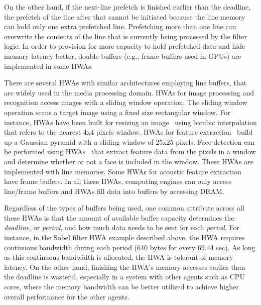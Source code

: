 \documentclass[10pt,letterpaper]{article}
\newcommand{\TMP}[1]{#1}
\newif\ifSQUEEZE
\begin{document}
On the other hand, if the next-line prefetch is finished earlier
than the deadline, the prefetch of the line after that cannot be
initiated because the line memory can hold only one extra
prefetched line. Prefetching more than one line can overwrite the
contents of the line that is currently being processed by the
filter logic. 
\TMP{In order to provision for more capacity to hold prefetched
data and hide memory latency better, double buffers (e.g., frame buffers used in
GPUs) are implemented in some HWAs.}


\ifSQUEEZE
There are several HWAs with similar architectures employing line/frame
buffers, which are widely used in the media processing domain. 
HWAs for resizing an image~\cite{resizing} or feature extraction~\cite{HWA_sift,HWA_face}
use line buffers. HWAs for acoustic feature extraction~\cite{HWA_acoustic} use frame buffers. 
In all these HWAs, computing engines can only access line/frame
buffers and data is prefetched into these buffers from main
memory.
\else
There are several HWAs with similar architectures employing line buffers, that
are widely used in the media processing domain. HWAs for image processing and
recognition access images with a sliding window operation. The sliding window
operation scans a target image using a fixed size rectangular window. For
instance, HWAs have been built for resizing an image~\cite{resizing} using
bicubic interpolation that refers to the nearest 4x4 pixels window. HWAs for
feature extraction~\cite{HWA_sift} build up a Gaussian pyramid with a sliding
window of 25x25 pixels. Face detection can be performed using
HWAs~\cite{HWA_face} that extract feature data from the pixels in a window and
determine whether or not a face is included in the window. These HWAs are
implemented with line memories. Some HWAs for acoustic feature
extraction~\cite{HWA_acoustic} have frame buffers. In all these HWAs, computing
engines can only access line/frame buffers and HWAs fill data into buffers by
accessing DRAM.
\fi

Regardless of the types of buffers being used, one common
attribute across all these HWAs is that the amount of available
buffer capacity determines the \emph{deadline}, or \emph{period}, and how much
data needs to be sent for each \emph{period}. For instance, in
the Sobel filter HWA example described above, the HWA requires
continuous bandwidth during each period (640 bytes for every 69.44
sec). As long as this continuous bandwidth is allocated,
the HWA is tolerant of memory latency. On the other hand, finishing the
HWA's memory accesses earlier than the deadline is wasteful,
\TMP{especially in a system with other agents such as CPU cores, where
the memory bandwidth can be better utilized to achieve higher
overall performance for the other agents.}
\end{document}
